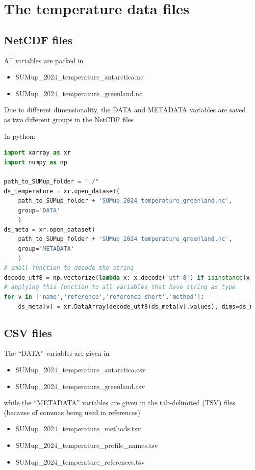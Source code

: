 \documentclass[journal abbreviation, manuscript]{copernicus}
\begin{document}


\section{The temperature data files}
\subsection{NetCDF files}

All variables are packed in 
\begin{itemize}
\item SUMup\_2024\_temperature\_antarctica.nc
\item SUMup\_2024\_temperature\_greenland.nc
\end{itemize}
Due to different dimensionality, the DATA and METADATA variables are saved as two different groups in the NetCDF files

In python:
\begin{lstlisting}[language=python]
import xarray as xr
import numpy as np

path_to_SUMup_folder = "./"
ds_temperature = xr.open_dataset(
    path_to_SUMup_folder + 'SUMup_2024_temperature_greenland.nc', 
    group='DATA'
    )
ds_meta = xr.open_dataset(
    path_to_SUMup_folder + 'SUMup_2024_temperature_greenland.nc',
    group='METADATA'
    )
# small function to decode the string
decode_utf8 = np.vectorize(lambda x: x.decode('utf-8') if isinstance(x, bytes) else x)
# applying this function to all variables that have string as type
for v in ['name','reference','reference_short','method']:
    ds_meta[v] = xr.DataArray(decode_utf8(ds_meta[v].values), dims=ds_meta[v].dims)
\end{lstlisting} 

\subsection{CSV files}
The “DATA” variables are given in 
\begin{itemize}
\item SUMup\_2024\_temperature\_antarctica.csv 
\item SUMup\_2024\_temperature\_greenland.csv 
\end{itemize}
while the “METADATA” variables are given in the tab-delimited (TSV) files (because of commas being used in references)
\begin{itemize}
\item SUMup\_2024\_temperature\_methods.tsv
\item SUMup\_2024\_temperature\_profile\_names.tsv
\item SUMup\_2024\_temperature\_references.tsv
\end{itemize}
\end{document}
